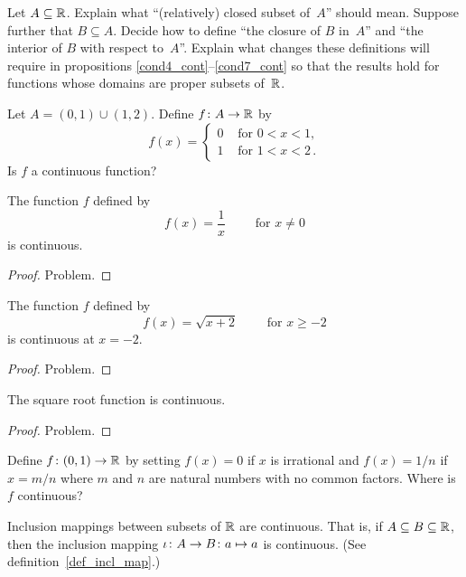 \begin{prob} Let $A \subseteq \mathbb{R}$.  Explain what ``(relatively) closed subset of~$A$'' should mean.
Suppose further that $B \subseteq A$.  Decide how to define ``the closure of $B$ in~$A$'' and
``the interior of $B$ with respect to~$A$''.  Explain what changes these definitions will
require in propositions \ref{cond4_cont}--\ref{cond7_cont} so that the results hold for
functions whose domains are proper subsets of~$\mathbb{R}$.
\end{prob}

\begin{prob} Let $A = (0,1) \cup (1,2)$.  Define $f\colon A \rightarrow \mathbb{R}$ by
  \[f(x) = \begin{cases}   0   &\text{ for $0<x<1$}, \\
                           1   &\text{ for $1<x<2$}\,.
\end{cases}\]
Is $f$ a continuous function?
\end{prob}

\begin{exam} The function $f$ defined by
  \[f(x) = \frac1x \qquad\text{ for } x \ne 0\]
is continuous.
\end{exam}

\begin{proof} Problem.  \ns \end{proof}

\begin{exam} The function $f$ defined by
  \[f(x) = \sqrt{x+2} \qquad\text{ for } x \ge -2\]
is continuous at $x=-2$.
\end{exam}

\begin{proof} Problem.  \ns \end{proof}

\begin{exam} The square root function is continuous.
\end{exam}

\begin{proof} Problem.  \ns \end{proof}

\begin{prob} Define $f\colon (0,1) \rightarrow \mathbb{R}$ by setting $f(x) =0$ if $x$ is irrational and
$f(x) = 1/n$ if $x = m/n$ where $m$ and $n$ are natural numbers with no common factors.  Where
is $f$ continuous?
\end{prob}

\begin{exam}\label{cont_exam5} Inclusion mappings between subsets of $\mathbb{R}$ are continuous.
That is, if $A \subseteq B \subseteq \mathbb{R}$, then the inclusion mapping $\iota\colon A \rightarrow
B\colon a \mapsto a$ is continuous.  (See definition~\ref{def_incl_map}.)
\end{exam}

